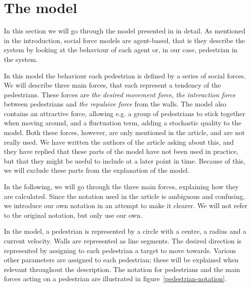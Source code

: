 \section{The model}
\label{sec:the-model}
In this section we will go through the model presented in \cite{self-org} in 
detail. As mentioned in the introduction, social force models are agent-based, 
that is they describe the system by looking at the behaviour of each agent or, 
in our case, pedestrian in the system.


In this model the behaviour each pedestrian is defined by a series of social 
forces. We will describe three main forces, that each represent a tendency of 
the pedestrians. These forces are \emph{the desired movement force},  
\emph{the interaction force} between pedestrians and \emph{the repulsive 
force}  from the walls. The model also contains an attractive force, allowing 
e.g. a group of pedestrians to stick together when moving around, and a 
fluctuation term, adding a stochastic quality to the model. Both these forces, 
however, are only mentioned in the article, and are not really used. We have 
written the authors of the article asking about this, and they have replied 
that these parts of the model have not been used in practice, but that they 
might be useful to include at a later point in time.  Because of this, we will 
exclude these parts from the explanation of the model.

In the following, we will go through the three main forces, explaining how 
they are calculated. Since the notation used in the article is ambiguous and 
confusing, we introduce our own notation in an attempt to make it clearer. We 
will not refer to the original notation, but only use our own.


In the model, a pedestrian is represented by a circle with a centre, a radius 
and a current velocity. Walls are represented as line segments. The desired 
direction is represented by assigning to each pedestrian a target to move 
towards. Various other parameters are assigned to each pedestrian; these will 
be explained when relevant throughout the description. The notation for 
pedestrians and the main forces acting on a pedestrian are illustrated in  
figure~\ref{pedestrian-notation}.  

